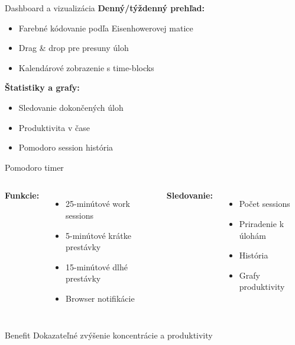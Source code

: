 \documentclass{beamer}
\begin{document}
\begin{frame}{Dashboard a vizualizácia}
\textbf{Denný/týždenný prehľad:}
\begin{itemize}
\item Farebné kódovanie podľa Eisenhowerovej matice
\item Drag \& drop pre presuny úloh
\item Kalendárové zobrazenie s time-blocks
\end{itemize}

\vspace{0.5cm}
\textbf{Štatistiky a grafy:}
\begin{itemize}
\item Sledovanie dokončených úloh
\item Produktivita v čase
\item Pomodoro session história
\end{itemize}
\end{frame}

\begin{frame}{Pomodoro timer}
\begin{columns}
\textbf{Funkcie:}
\begin{itemize}
\item 25-minútové work sessions
\item 5-minútové krátke prestávky
\item 15-minútové dlhé prestávky
\item Browser notifikácie
\end{itemize}

\textbf{Sledovanie:}
\begin{itemize}
\item Počet sessions
\item Priradenie k úlohám
\item História
\item Grafy produktivity
\end{itemize}
\end{columns}

\vspace{0.5cm}
\begin{block}{Benefit}
Dokazateľné zvýšenie koncentrácie a produktivity
\end{block}
\end{frame}
\end{document}
